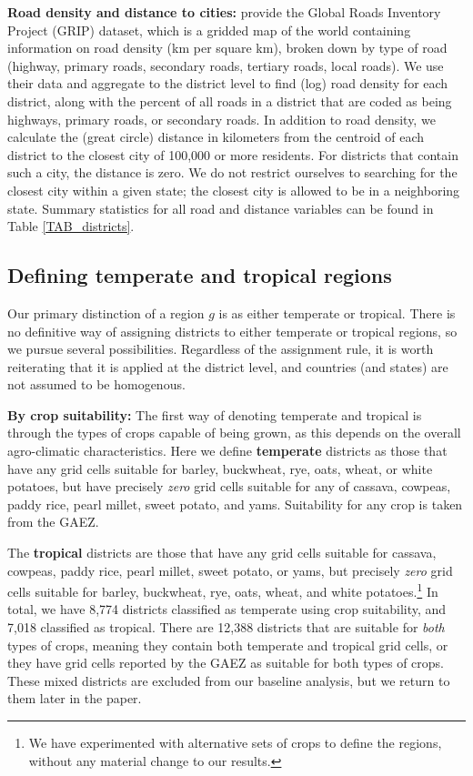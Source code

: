 \documentclass[12pt]{article}
\begin{document}
\vspace{.5cm}\noindent\textbf{Road density and distance to cities:} \citet{GRIPS} provide the Global Roads Inventory Project (GRIP) dataset, which is a gridded map of the world containing information on road density (km per square km), broken down by type of road (highway, primary roads, secondary roads, tertiary roads, local roads). We use their data and aggregate to the district level to find (log) road density for each district, along with the percent of all roads in a district that are coded as being highways, primary roads, or secondary roads. In addition to road density, we calculate the (great circle) distance in kilometers from the centroid of each district to the closest city of 100,000 or more residents. For districts that contain such a city, the distance is zero. We do not restrict ourselves to searching for the closest city within a given state; the closest city is allowed to be in a neighboring state. Summary statistics for all road and distance variables can be found in Table \ref{TAB_districts}. 

\subsection{Defining temperate and tropical regions}
Our primary distinction of a region $g$ is as either temperate or tropical. There is no definitive way of assigning districts to either temperate or tropical regions, so we pursue several possibilities. Regardless of the assignment rule, it is worth reiterating that it is applied at the district level, and countries (and states) are not assumed to be homogenous. 

\vspace{.5cm}\noindent\textbf{By crop suitability:} The first way of denoting temperate and tropical is through the types of crops capable of being grown, as this depends on the overall agro-climatic characteristics. Here we define \textbf{temperate} districts as those that have any grid cells suitable for barley, buckwheat, rye, oats, wheat, or white potatoes, but have precisely \textit{zero} grid cells suitable for any of cassava, cowpeas, paddy rice, pearl millet, sweet potato, and yams. Suitability for any crop is taken from the GAEZ.

The \textbf{tropical} districts are those that have any grid cells suitable for cassava, cowpeas, paddy rice, pearl millet, sweet potato, or yams, but precisely \textit{zero} grid cells suitable for barley, buckwheat, rye, oats, wheat, and white potatoes.\footnote{We have experimented with alternative sets of crops to define the regions, without any material change to our results.} In total, we have 8,774 districts classified as temperate using crop suitability, and 7,018 classified as tropical. There are 12,388 districts that are suitable for \textit{both} types of crops, meaning they contain both temperate and tropical grid cells, or they have grid cells reported by the GAEZ as suitable for both types of crops. These mixed districts are excluded from our baseline analysis, but we return to them later in the paper.
\end{document}

